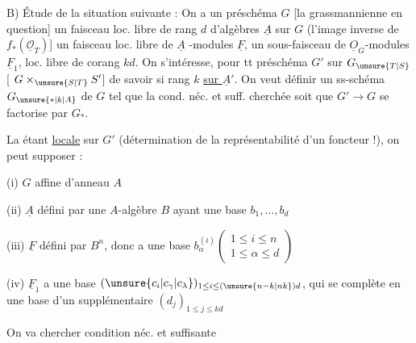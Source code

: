 
B) Étude de la situation suivante : On a un préschéma $G$ [la grassmannienne en question] un faisceau loc. libre de rang $d$ d'algèbres $\underline A$ sur $G$ (l'image inverse de $f_*(\underline{\mathcal O}_T)$] un faisceau loc. libre de $\underline A$ -modules $\underline F$, un sous-faisceau de $\underline O_G$-modules $\underline F_1$,  loc. libre de corang $kd$. On s'intéresse, pour tt préschéma $G'$ sur $G_{\unsure{T|S}}$ [ $G\times_{\unsure{S|T}} S'$] de savoir si   rang $k$ \uline{sur $\underline A'$}. On veut définir un ss-schéma  $G_{\unsure{\ast|k|A}}$ de $G$ tel que la cond. néc. et suff. cherchée soit que $G'\to G$ se factorise par $G_{\ast}$.

La   étant \uline{locale} sur $G'$ (détermination de la représentabilité d'un foncteur !), on peut supposer : 

(i)  $G$ affine d'anneau $A$

(ii) $\underline A$ défini par une $A$-algèbre $B$ ayant une base $b_1,\ldots,b_d$

(iii) $\underline F$ défini par $B^n$, donc a une base $b_\alpha^{(i)}\left(\begin{smallmatrix}1\leq i\leq n\\1\leq\alpha\leq d\end{smallmatrix}\right)$

(iv) $\underline F_1$ a une base  $(\unsure{c_i|c_\gamma|c_\lambda})_{1\leq i\leq(\unsure{n-k|nk})d}$, qui se complète en une base d'un supplémentaire $(d_j)_{1\leq j\leq kd}$

On va chercher   condition néc. et suffisante

